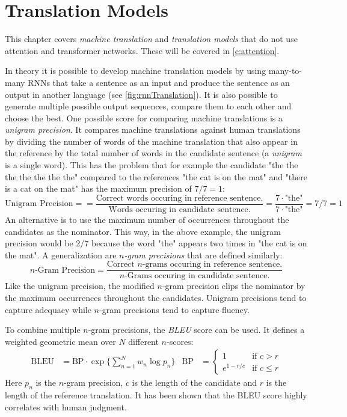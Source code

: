 	\section{Translation Models}
		\label{sec:translation}

		This chapter covers \emph{machine translation} and \emph{translation models} that do not use attention and transformer networks. These will be covered in \autoref{c:attention}.

		In theory it is possible to develop machine translation models by using many-to-many RNNs that take a sentence as an input and produce the sentence as an output in another language (see \autoref{fig:rnnTranslation}). It is also possible to generate multiple possible output sequences, compare them to each other and choose the best. One possible score for comparing machine translations is a \emph{unigram precision}. It compares machine translations against human translations by dividing the number of words of the machine translation that also appear in the reference by the total number of words in the candidate sentence (a \emph{unigram} is a single word). This has the problem that for example the candidate "the the the the the the the" compared to the references "the cat is on the mat" and "there is a cat on the mat" has the maximum precision of \( 7/7 = 1 \):
		\begin{equation}
			\text{Unigram Precision} =
			= \frac{\text{Correct words occuring in reference sentence.}}{\text{Words occuring in candidate sentence.}}
			= \frac{7 \cdot \text{"the"}}{7 \cdot \text{"the"}}
			= 7/7 = 1
		\end{equation}
		An alternative is to use the maximum number of occurrences throughout the candidates as the nominator. This way, in the above example, the unigram precision would be \(2/7\) because the word "the" appears two times in "the cat is on the mat". A generalization are \emph{\(n\)-gram precisions} that are defined similarly:
		\begin{equation}
			\text{\(n\)-Gram Precision}
			= \frac{\text{Correct \(n\)-grams occuring in reference sentence.}}{\text{\(n\)-Grams occuring in candidate sentence.}}
		\end{equation}
		Like the unigram precision, the modified \(n\)-gram precision clips the nominator by the maximum occurrences throughout the candidates. Unigram precisions tend to capture adequacy while \(n\)-gram precisions tend to capture fluency.

		To combine multiple \(n\)-gram precisions, the \emph{BLEU} score can be used. It defines a weighted geometric mean over \(N\) different \(n\)-scores:
		\begin{align}
			\text{BLEU} & = \text{BP} \cdot \exp\bigg\{ \sum_{n = 1}^{N} w_n \log p_n \bigg\} &
			\text{BP}   & =
			\begin{cases}
				1           & \text{if } c > r    \\
				e^{1 - r/c} & \text{if } c \leq r
			\end{cases}
		\end{align}
		Here \(p_n\) is the \(n\)-gram precision, \(c\) is the length of the candidate and \(r\) is the length of the reference translation. It has been shown that the BLEU score highly correlates with human judgment.

